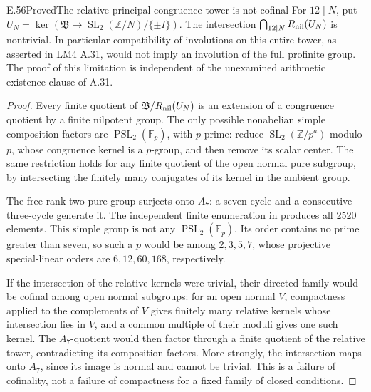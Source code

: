 \begin{result}{E.56}{Proved}{The relative principal-congruence tower is not cofinal}
For \(12\mid N\), put \(U_N=\ker(\mathfrak B\to
\operatorname{SL}_2(\mathbb Z/N)/\{\pm I\})\).
The intersection \(\bigcap_{12\mid N}R_{\rm nil}(U_N)\)
is nontrivial. In particular compatibility of involutions on this
entire tower, as asserted in LM4 A.31, would not imply an involution
of the full profinite group. The proof of this limitation is independent
of the unexamined arithmetic existence clause of A.31.
\end{result}
\begin{proof}
Every finite quotient of \(\mathfrak B/R_{\rm nil}(U_N)\)
is an extension of a congruence quotient by a finite nilpotent group.
The only possible nonabelian simple composition factors are
\(\operatorname{PSL}_2(\mathbb F_p)\), with \(p\) prime:
reduce \(\operatorname{SL}_2(\mathbb Z/p^a)\) modulo \(p\),
whose congruence kernel is a \(p\)-group, and then remove its scalar
center. The same restriction holds for any finite quotient of the
open normal pure subgroup, by intersecting the finitely many conjugates
of its kernel in the ambient group.

The free rank-two pure group surjects onto \(A_7\): a seven-cycle
and a consecutive three-cycle generate it. The independent finite
enumeration in  produces all
2520 elements. This simple group is not any
\(\operatorname{PSL}_2(\mathbb F_p)\). Its order contains no
prime greater than seven, so such a \(p\) would be among
\(2,3,5,7\), whose projective special-linear orders are
\(6,12,60,168\), respectively.

If the intersection of the relative kernels were trivial, their
directed family would be cofinal among open normal subgroups: for
an open normal \(V\), compactness applied to the complements of
\(V\) gives finitely many relative kernels whose intersection lies
in \(V\), and a common multiple of their moduli gives one such
kernel. The \(A_7\)-quotient would then factor through a finite
quotient of the relative tower, contradicting its composition factors.
More strongly, the intersection maps onto \(A_7\), since its image
is normal and cannot be trivial. This is a failure of cofinality, not
a failure of compactness for a fixed family of closed conditions.
\end{proof}

